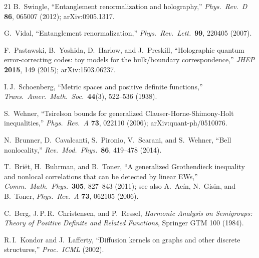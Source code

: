 \documentclass[11pt,a4paper]{article}
\theoremstyle{definition}
\theoremstyle{remark}
\begin{document}
\begin{thebibliography}{21}
B.~Swingle,
``Entanglement renormalization and holography,''
\emph{Phys.\ Rev.\ D} \textbf{86}, 065007 (2012);
arXiv:0905.1317.

G.~Vidal,
``Entanglement renormalization,''
\emph{Phys.\ Rev.\ Lett.}\ \textbf{99}, 220405 (2007).

F.~Pastawski, B.~Yoshida, D.~Harlow, and J.~Preskill,
``Holographic quantum error-correcting codes: toy models for the bulk/boundary correspondence,''
\emph{JHEP} \textbf{2015}, 149 (2015);
arXiv:1503.06237.

I.\,J.~Schoenberg,
``Metric spaces and positive definite functions,''
\emph{Trans.\ Amer.\ Math.\ Soc.}\ \textbf{44}(3), 522--536 (1938).

S.~Wehner,
``Tsirelson bounds for generalized Clauser-Horne-Shimony-Holt inequalities,''
\emph{Phys.\ Rev.\ A} \textbf{73}, 022110 (2006);
arXiv:quant-ph/0510076.

N.~Brunner, D.~Cavalcanti, S.~Pironio, V.~Scarani, and S.~Wehner,
``Bell nonlocality,''
\emph{Rev.\ Mod.\ Phys.}\ \textbf{86}, 419--478 (2014).

T.~Bri\"et, H.~Buhrman, and B.~Toner,
``A generalized Grothendieck inequality and nonlocal correlations that can be detected by linear EWs,''
\emph{Comm.\ Math.\ Phys.}\ \textbf{305}, 827--843 (2011);
see also A.~Ac\'in, N.~Gisin, and B.~Toner, \emph{Phys.\ Rev.\ A} \textbf{73}, 062105 (2006).

C.~Berg, J.\,P.\,R.~Christensen, and P.~Ressel,
\emph{Harmonic Analysis on Semigroups: Theory of Positive Definite and Related Functions},
Springer GTM 100 (1984).

R.\,I.~Kondor and J.~Lafferty,
``Diffusion kernels on graphs and other discrete structures,''
\emph{Proc.\ ICML} (2002).

\end{thebibliography}
\end{document}

